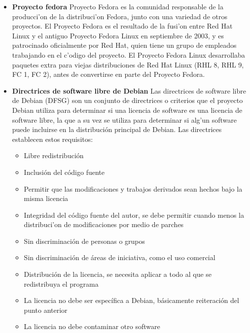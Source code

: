 \begin{itemize}
	\item {\bf Proyecto fedora}
Proyecto Fedora es la comunidad responsable de la producci'on de la distribuci'on Fedora, junto con una variedad de otros proyectos. El Proyecto Fedora es el resultado de la fusi'on entre Red Hat Linux y el antiguo Proyecto Fedora Linux en septiembre de 2003, y es patrocinado oficialmente por Red Hat, quien tiene un grupo de empleados trabajando en el c'odigo del proyecto. El Proyecto Fedora Linux desarrollaba paquetes extra para viejas distribuciones de Red Hat Linux (RHL 8, RHL 9, FC 1, FC 2), antes de convertirse en parte del Proyecto Fedora.
	\item {\bf Directrices de software libre de Debian}
Las directrices de software libre de Debian (DFSG) son un conjunto de directrices o criterios que el proyecto Debian utiliza para determinar si una licencia de software es una licencia de software libre, la que a su vez se utiliza para determinar si alg'un software puede incluirse en la distribución principal de Debian. Las directrices establecen estos requisitos:
\begin{itemize}
	\item Libre redistribuci\'on
	\item Inclusión del c\'odigo fuente
	\item Permitir que las modificaciones y trabajos derivados sean hechos bajo la misma licencia
	\item	Integridad del c\'odigo fuente del autor, se debe permitir cuando menos la distribuci'on de modificaciones por medio de parches
	\item Sin discriminaci\'on de personas o grupos
	\item Sin discriminaci\'on de áreas de iniciativa, como el uso comercial
	\item Distribuci\'on de la licencia, se necesita aplicar a todo al que se redistribuya el programa
	\item La licencia no debe ser específica a Debian, b\'asicamente reiteraci\'on del punto anterior
	\item La licencia no debe contaminar otro software
\end{itemize}
\end{itemize}
\newpage
